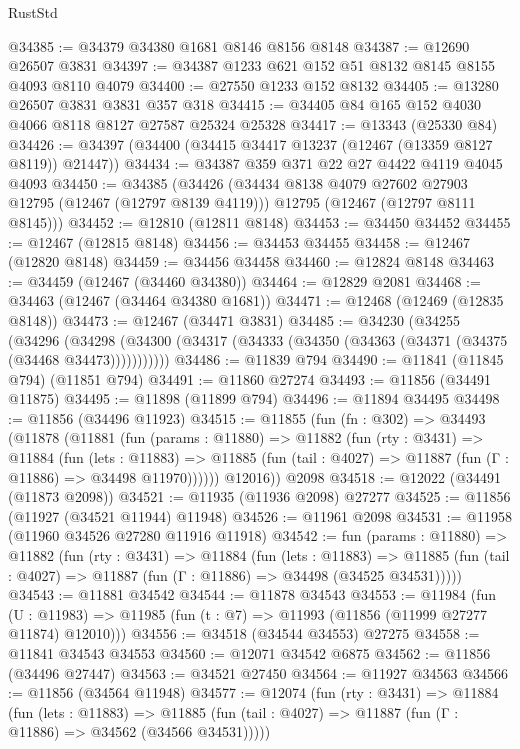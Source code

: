 \begin{lexlean}{RustStd}
\begin{coremodule}
@34385 := @34379 @34380 @1681 @8146 @8156 @8148
@34387 := @12690 @26507 @3831
@34397 := @34387 @1233 @621 @152 @51 @8132 @8145 @8155 @4093 @8110 @4079
@34400 := @27550 @1233 @152 @8132
@34405 := @13280 @26507 @3831 @3831 @357 @318
@34415 := @34405 @84 @165 @152 @4030 @4066 @8118 @8127 @27587 @25324 @25328
@34417 := @13343 (@25330 @84)
@34426 := @34397 (@34400 (@34415 @34417 @13237 (@12467 (@13359 @8127 @8119)) @21447))
@34434 := @34387 @359 @371 @22 @27 @4422 @4119 @4045 @4093
@34450 := @34385
    (@34426
      (@34434 @8138 @4079 @27602 @27903 @12795 (@12467 (@12797 @8139 @4119)))
      @12795
      (@12467 (@12797 @8111 @8145)))
@34452 := @12810 (@12811 @8148)
@34453 := @34450 @34452
@34455 := @12467 (@12815 @8148)
@34456 := @34453 @34455
@34458 := @12467 (@12820 @8148)
@34459 := @34456 @34458
@34460 := @12824 @8148
@34463 := @34459 (@12467 (@34460 @34380))
@34464 := @12829 @2081
@34468 := @34463 (@12467 (@34464 @34380 @1681))
@34471 := @12468 (@12469 (@12835 @8148))
@34473 := @12467 (@34471 @3831)
@34485 := @34230
    (@34255
      (@34296
        (@34298 (@34300 (@34317 (@34333 (@34350 (@34363 (@34371 (@34375 (@34468 @34473)))))))))))
@34486 := @11839 @794
@34490 := @11841 (@11845 @794) (@11851 @794)
@34491 := @11860 @27274
@34493 := @11856 (@34491 @11875)
@34495 := @11898 (@11899 @794)
@34496 := @11894 @34495
@34498 := @11856 (@34496 @11923)
@34515 := @11855
    (fun (fn : @302) =>
    @34493
      (@11878
        (@11881
          (fun (params : @11880) =>
          @11882
            (fun (rty : @3431) =>
            @11884
              (fun (lets : @11883) =>
              @11885 (fun (tail : @4027) => @11887 (fun (Γ : @11886) => @34498 @11970))))))
        @12016))
    @2098
@34518 := @12022 (@34491 (@11873 @2098))
@34521 := @11935 (@11936 @2098) @27277
@34525 := @11856 (@11927 (@34521 @11944) @11948)
@34526 := @11961 @2098
@34531 := @11958 (@11960 @34526 @27280 @11916 @11918)
@34542 := fun (params : @11880) =>
  @11882
    (fun (rty : @3431) =>
    @11884
      (fun (lets : @11883) =>
      @11885 (fun (tail : @4027) => @11887 (fun (Γ : @11886) => @34498 (@34525 @34531)))))
@34543 := @11881 @34542
@34544 := @11878 @34543
@34553 := @11984
    (fun (U : @11983) => @11985 (fun (t : @7) => @11993 (@11856 (@11999 @27277 @11874) @12010)))
@34556 := @34518 (@34544 @34553) @27275
@34558 := @11841 @34543 @34553
@34560 := @12071 @34542 @6875
@34562 := @11856 (@34496 @27447)
@34563 := @34521 @27450
@34564 := @11927 @34563
@34566 := @11856 (@34564 @11948)
@34577 := @12074
    (fun (rty : @3431) =>
    @11884
      (fun (lets : @11883) =>
      @11885 (fun (tail : @4027) => @11887 (fun (Γ : @11886) => @34562 (@34566 @34531)))))

\end{coremodule}
\end{lexlean}
